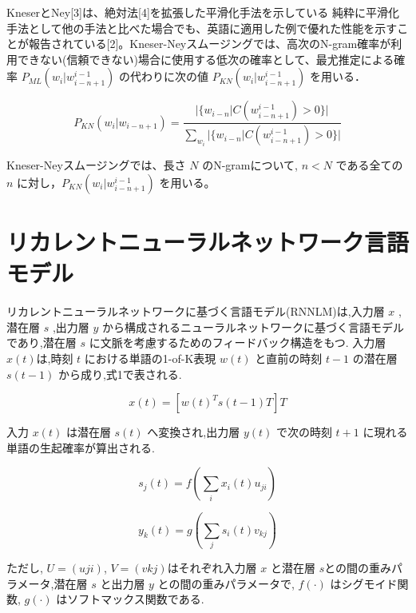 
KneserとNey[3]は、絶対法[4]を拡張した平滑化手法を示している
純粋に平滑化手法として他の手法と比べた場合でも、英語に適用した例で優れた性能を示すことが報告されている[2]。Kneser-Neyスムージングでは、高次のN-gram確率が利用できない(信頼できない)場合に使用する低次の確率として、最尤推定による確率 $P_{ML} (w_i|w_{i-n+1}^{i-1})$ の代わりに次の値 $P_{KN} (w_i|w_{i-n+1}^{i-1})$ を用いる．

\begin{equation}
		P_{KN} (w_i|w_{i-n+1}) = \frac{|\{w_{i-n}|C(w_{i-n+1}^{i-1}) > 0\}|}{\sum_{w_i} |\{w_{i-n}|C(w_{i-n+1}^{i-1}) > 0\}|} 
    \label{ngram_smoosing2}
\end{equation}

Kneser-Neyスムージングでは、長さ $N$ のN-gramについて, $n  <  N$ である全ての $n$ に対し，$P_{KN} (w_i|w_{i-n+1}^{i-1})$ を用いる。

\section{リカレントニューラルネットワーク言語モデル}
リカレントニューラルネットワークに基づく言語モデル(RNNLM)は,入力層 $x$ ,潜在層 $s$ ,出力層 $y$ から構成されるニューラルネットワークに基づく言語モデルであり,潜在層 $s$ に文脈を考慮するためのフィードバック構造をもつ. 入力層 $x(t)$は,時刻 $t$ における単語の1-of-K表現 $w(t)$ と直前の時刻 $t−1$
の潜在層 $s(t−1)$ から成り,式1で表される.

\begin{equation}
		x(t) = [w(t)^T s(t-1)T]T
    \label{rnn1}
\end{equation}

入力 $x(t)$ は潜在層 $s(t)$ へ変換され,出力層 $y(t)$ で次の時刻 $t+1$ に現れる単語の生起確率が算出される.

\begin{equation}
		s_j(t) = f(\sum_i x_i(t) u_{ji})
    \label{rnn2}
\end{equation}

\begin{equation}
		y_k(t) = g(\sum_j s_i(t) v_{kj})
    \label{rnn3}
\end{equation}

ただし, $U=(uji)$, $V=(vkj)$はそれぞれ入力層 $x$ と潜在層 $s$との間の重みパラメータ,潜在層 $s$
と出力層 $y$ との間の重みパラメータで, $f(·)$ はシグモイド関数, $g(·)$ はソフトマックス関数である.

